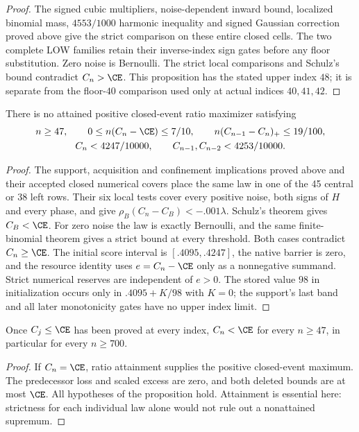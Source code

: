 \begin{proof}
The signed cubic multipliers, noise-dependent inward bound, localized
binomial mass, $4553/1000$ harmonic inequality and signed Gaussian
correction proved above give the strict comparison on these entire
closed cells. The two complete LOW families retain their inverse-index
sign gates before any floor substitution. Zero noise is Bernoulli.
The strict local comparisons and Schulz's bound contradict $C_n>\CE$.
This proposition has the stated upper index $48$; it is separate from the
floor-$40$ comparison used only at actual indices $40,41,42$.
\end{proof}

\begin{proposition}\label{j:local:uniform}
There is no attained positive closed-event ratio maximizer satisfying
\begin{gather*}
 n\ge47,\qquad 0\le n(C_n-\CE)\le7/10,\qquad
 n(C_{n-1}-C_n)_+\le19/100,\\
 C_n<4247/10000,\qquad C_{n-1},C_{n-2}<4253/10000.
\end{gather*}
\end{proposition}
\begin{proof}
The support, acquisition and confinement implications proved above and
their accepted closed numerical covers place the same law in one of the
45 central or 38 left rows. Their six local tests cover every positive
noise, both signs of $H$ and every phase, and give
$\rho_B(C_n-C_B)<-.001\lambda$. Schulz's theorem gives $C_B<\CE$.
For zero noise the law is exactly Bernoulli, and the same finite-binomial
theorem gives a strict bound at every threshold. Both cases contradict
$C_n\ge\CE$.
The initial score interval is $[.4095,.4247]$, the native barrier is zero,
and the resource identity uses $e=C_n-\CE$ only as a nonnegative summand.
Strict numerical reserves are independent of $e>0$. The stored value $98$
in initialization occurs only in $.4095+K/98$ with $K=0$; the support's
last band and all later monotonicity gates have no upper index limit.
\end{proof}
\begin{corollary}\label{j:local:equality}
Once $C_j\le\CE$ has been proved at every index, $C_n<\CE$ for every
$n\ge47$, in particular for every $n\ge700$.
\end{corollary}
\begin{proof}
If $C_n=\CE$, ratio attainment supplies the positive closed-event maximum.
The predecessor loss and scaled excess are zero, and both deleted bounds
are at most $\CE$. All hypotheses of the proposition hold. Attainment is
essential here: strictness for each individual law alone would not rule
out a nonattained supremum.
\end{proof}
